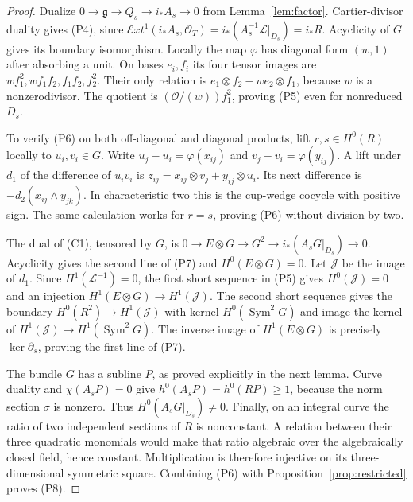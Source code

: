 \documentclass[11pt]{article}
\theoremstyle{definition}\newtheorem{definition}[theorem]{Definition}
\theoremstyle{remark}\newtheorem{remark}[theorem]{Remark}
\newcommand{\OO}{\mathcal O}
\begin{document}
\begin{proof}
Dualize $0\to\mathfrak g\to Q_s\to i_*A_s\to0$ from Lemma~\ref{lem:factor}. Cartier-divisor duality gives (P4), since
$\mathcal E xt^1(i_*A_s,\OO_T)=i_*(A_s^{-1}\mathcal L|_{D_s})=i_*R$.
Acyclicity of $G$ gives its boundary isomorphism. Locally the map $\varphi$ has diagonal form $(w,1)$ after absorbing a unit. On bases $e_i,f_i$ its four tensor images are
$wf_1^2,wf_1f_2,f_1f_2,f_2^2$. Their only relation is
$e_1\otimes f_2-w e_2\otimes f_1$, because $w$ is a nonzerodivisor. The quotient is $(\OO/(w))f_1^2$, proving (P5) even for nonreduced $D_s$.

To verify (P6) on both off-diagonal and diagonal products, lift $r,s\in H^0(R)$ locally to $u_i,v_i\in G$. Write
$u_j-u_i=\varphi(x_{ij})$ and $v_j-v_i=\varphi(y_{ij})$.
A lift under $d_1$ of the difference of $u_iv_i$ is
$z_{ij}=x_{ij}\otimes v_j+y_{ij}\otimes u_i$.
Its next difference is
$-d_2(x_{ij}\wedge y_{jk})$.
In characteristic two this is the cup-wedge cocycle with positive sign. The same calculation works for $r=s$, proving (P6) without division by two.

The dual of (C1), tensored by $G$, is
$0\to E\otimes G\to G^2\to i_*(A_sG|_{D_s})\to0$.
Acyclicity gives the second line of (P7) and $H^0(E\otimes G)=0$.
Let $\mathcal J$ be the image of $d_1$. Since
$H^1(\mathcal L^{-1})=0$, the first short sequence in (P5) gives
$H^0(\mathcal J)=0$ and an injection
$H^1(E\otimes G)\to H^1(\mathcal J)$.
The second short sequence gives the boundary
$H^0(R^2)\to H^1(\mathcal J)$ with kernel
$H^0(\operatorname{Sym}^2G)$ and image the kernel of
$H^1(\mathcal J)\to H^1(\operatorname{Sym}^2G)$.
The inverse image of $H^1(E\otimes G)$ is precisely $\ker\partial_s$, proving the first line of (P7).

The bundle $G$ has a subline $P$, as proved explicitly in the next lemma. Curve duality and $\chi(A_sP)=0$ give
$h^0(A_sP)=h^0(RP)\ge1$, because the norm section $\sigma$ is nonzero. Thus $H^0(A_sG|_{D_s})\ne0$. Finally, on an integral curve the ratio of two independent sections of $R$ is nonconstant. A relation between their three quadratic monomials would make that ratio algebraic over the algebraically closed field, hence constant. Multiplication is therefore injective on its three-dimensional symmetric square. Combining (P6) with Proposition~\ref{prop:restricted} proves (P8).
\end{proof}
\end{document}
